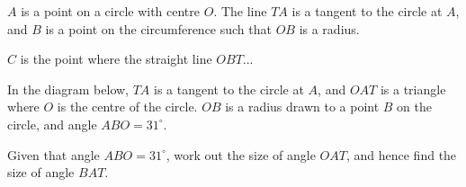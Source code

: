 \begin{question}
\noindent $A$ is a point on a circle with centre $O$. The line $TA$ is a tangent to the circle at $A$, and $B$ is a point on the circumference such that $OB$ is a radius.

$C$ is the point where the straight line $OBT$... 

\noindent In the diagram below, $TA$ is a tangent to the circle at $A$, and $OAT$ is a triangle where $O$ is the centre of the circle. $OB$ is a radius drawn to a point $B$ on the circle, and angle $ABO = 31^\circ$.

\begin{center}
\end{center}

\noindent Given that angle $ABO = 31^\circ$, work out the size of angle $OAT$, and hence find the size of angle $BAT$.

\vspace{4.5cm}

\begin{flushright}
\end{flushright}
\end{question}
